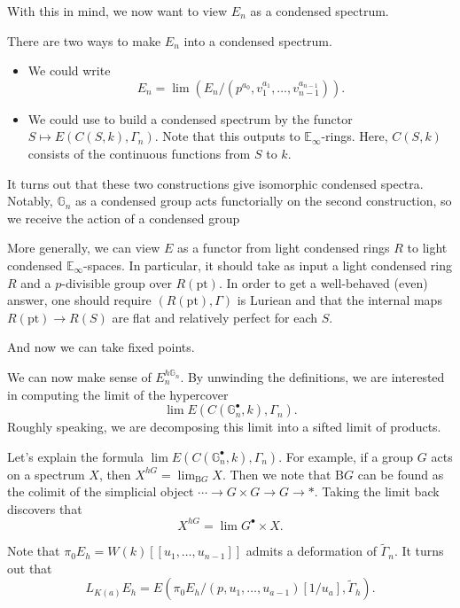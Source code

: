 \documentclass[../notes.tex]{subfiles}
\begin{document}
With this in mind, we now want to view $E_n$ as a condensed spectrum.
\begin{remark}
	There are two ways to make $E_n$ into a condensed spectrum.
	\begin{itemize}
		\item We could write
		\[E_n=\lim\left(E_n/\left(p^{a_0},v_1^{a_1},\ldots,v_{n-1}^{a_{n-1}}\right)\right).\]
		\item We could use  to build a condensed spectrum by the functor $S\mapsto E(C(S,k),\Gamma_n)$. Note that this outputs to $\mathbb E_\infty$-rings. Here, $C(S,k)$ consists of the continuous functions from $S$ to $k$.
	\end{itemize}
	It turns out that these two constructions give isomorphic condensed spectra. Notably, $\mathbb G_n$ as a condensed group acts functorially on the second construction, so we receive the action of a condensed group 
\end{remark}
\begin{remark}
	More generally, we can view $E$ as a functor from light condensed rings $R$ to light condensed $\mathbb E_\infty$-spaces. In particular, it should take as input a light condensed ring $R$ and a $p$-divisible group over $R(\mathrm{pt})$. In order to get a well-behaved (even) answer, one should require $(R(\mathrm{pt}),\Gamma)$ is Luriean and that the internal maps $R(\mathrm{pt})\to R(S)$ are flat and relatively perfect for each $S$.
\end{remark}
And now we can take fixed points.
\begin{example}
	We can now make sense of $E_n^{h\mathbb G_n}$. By unwinding the definitions, we are interested in computing the limit of the hypercover
	\[\lim E(C(\mathbb G_n^\bullet,k),\Gamma_n).\]
	Roughly speaking, we are decomposing this limit into a sifted limit of products.
\end{example}
\begin{remark}
	Let's explain the formula $\lim E(C(\mathbb G_n^\bullet,k),\Gamma_n)$. For example, if a group $G$ acts on a spectrum $X$, then $X^{hG}=\lim_{\mathrm BG}X$. Then we note that $\mathrm BG$ can be found as the colimit of the simplicial object $\cdots\to G\times G\to G\to*$. Taking the limit back discovers that
	\[X^{hG}=\lim G^\bullet\times X.\]
\end{remark}
\begin{example}
	Note that $\pi_0E_h=W(k)[[u_1,\ldots,u_{n-1}]]$ admits a deformation of $\widetilde\Gamma_n$. It turns out that
	\[L_{K(a)}E_h=E\left(\pi_0E_h/(p,u_1,\ldots,u_{a-1})[1/u_a],\widetilde\Gamma_h\right).\]
\end{example}
\end{document}
